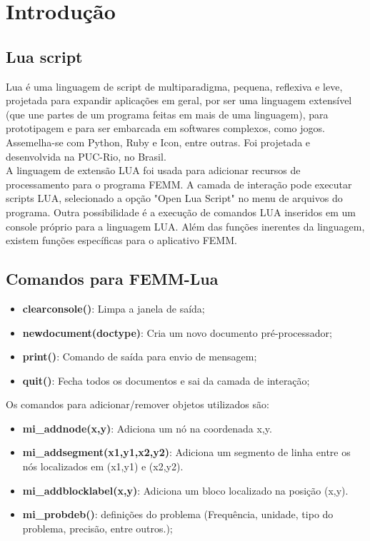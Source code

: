 \section{Introdução}
\label{cap2:introducao}
\subsection{Lua script}
Lua é uma linguagem de script de multiparadigma, pequena, reflexiva e leve, projetada para expandir aplicações em geral, por ser uma linguagem extensível (que une partes de um programa feitas em mais de uma linguagem), para prototipagem e para ser embarcada em softwares complexos, como jogos. Assemelha-se com Python, Ruby e Icon, entre outras. Foi projetada e desenvolvida na PUC-Rio, no Brasil.\\
A linguagem de extensão LUA foi usada para adicionar recursos de processamento para o programa FEMM. A camada de interação pode executar scripts LUA, selecionado a opção "Open Lua Script" no menu de arquivos do programa. Outra possibilidade é a execução de comandos LUA inseridos em um console próprio para a linguagem LUA. Além das funções inerentes da linguagem, existem funções específicas para o aplicativo FEMM.

\subsection{Comandos para FEMM-Lua}
\begin{itemize}
  \item \textbf{clearconsole()}: Limpa a janela de saída;
  \item \textbf{newdocument(doctype)}: Cria um novo documento pré-processador;
  \item \textbf{print()}: Comando de saída para envio de mensagem;
  \item \textbf{quit()}: Fecha todos os documentos e sai da camada de interação;
\end{itemize}

Os comandos para adicionar/remover objetos utilizados são:
\begin{itemize}
  \item \textbf{mi\_addnode(x,y)}: Adiciona um nó na coordenada x,y.
  \item \textbf{mi\_addsegment(x1,y1,x2,y2)}: Adiciona um segmento de linha entre os nós localizados em (x1,y1) e (x2,y2).
  \item \textbf{mi\_addblocklabel(x,y)}: Adiciona um bloco localizado na posição (x,y).
\end{itemize}

\begin{itemize}
  \item \textbf{mi\_probdeb()}: definições do problema (Frequência, unidade, tipo do problema, precisão, entre outros.);
\end{itemize}
